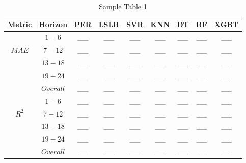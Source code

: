 \begin{table}[h]
\begin{center}
    \caption{Sample Table 1}
    \begin{tabular}{ c c c c c c c c c}
    	\toprule
    	\textbf{Metric} & \textbf{Horizon} & \textbf{PER} & \textbf{LSLR} & \textbf{SVR} & \textbf{KNN} & \textbf{DT} & \textbf{RF} & \textbf{XGBT}\\
    	\midrule
    	\multirow{3}{4em}{$MAE$} & $1 - 6$ & \_\_ & \_\_ & \_\_ & \_\_ & \_\_ & \_\_ & \_\_\\ &
    	$7 - 12$ & \_\_ & \_\_ & \_\_ & \_\_ & \_\_ & \_\_ & \_\_\\ &
    	$13 - 18$ & \_\_ & \_\_ & \_\_ & \_\_ & \_\_ & \_\_ & \_\_\\ &
    	$19 - 24$ & \_\_ & \_\_ & \_\_ & \_\_ & \_\_ & \_\_ & \_\_\\ &
    	$Overall$ & \_\_ & \_\_ & \_\_ & \_\_ & \_\_ & \_\_ & \_\_\\
    	\midrule
    	\multirow{3}{4em}{$R^2$} & $1 - 6$ & \_\_ & \_\_ & \_\_ & \_\_ & \_\_ & \_\_ & \_\_ \\ &
    	$7 - 12$ & \_\_ & \_\_ & \_\_ & \_\_ & \_\_ & \_\_ & \_\_\\ &
    	$13 - 18$ & \_\_ & \_\_ & \_\_ & \_\_ & \_\_ & \_\_ & \_\_\\ &
    	$19 - 24$ & \_\_ & \_\_ & \_\_ & \_\_ & \_\_ & \_\_ & \_\_\\ &
    	$Overall$ & \_\_ & \_\_ & \_\_ & \_\_ & \_\_ & \_\_ & \_\_\\
    	\bottomrule
    \end{tabular}
\end{center}
\end{table}

